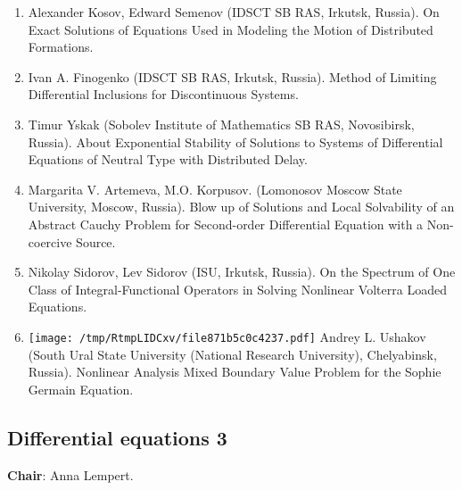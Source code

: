 \documentclass[
]{article}
\providecommand{\tightlist}{%
  \setlength{\itemsep}{0pt}\setlength{\parskip}{0pt}}
\begin{document}
\begin{enumerate}
\def\labelenumi{\arabic{enumi}.}
\tightlist
\item
  Alexander Kosov, Edward Semenov (IDSCT SB RAS, Irkutsk, Russia). On
  Exact Solutions of Equations Used in Modeling the Motion of
  Distributed Formations.
\item
  Ivan A. Finogenko (IDSCT SB RAS, Irkutsk, Russia). Method of Limiting
  Differential Inclusions for Discontinuous Systems.
\item
  Timur Yskak (Sobolev Institute of Mathematics SB RAS, Novosibirsk,
  Russia). About Exponential Stability of Solutions to Systems of
  Differential Equations of Neutral Type with Distributed Delay.
\item
  Margarita V. Artemeva, M.O. Korpusov. (Lomonosov Moscow State
  University, Moscow, Russia). Blow up of Solutions and Local
  Solvability of an Abstract Cauchy Problem for Second-order
  Differential Equation with a Non-coercive Source.
\item
  Nikolay Sidorov, Lev Sidorov (ISU, Irkutsk, Russia). On the Spectrum
  of One Class of Integral-Functional Operators in Solving Nonlinear
  Volterra Loaded Equations.
\item
  \protect\texttt{[image: /tmp/RtmpLIDCxv/file871b5c0c4237.pdf]}
  Andrey L. Ushakov (South Ural State University (National Research
  University), Chelyabinsk, Russia). Nonlinear Analysis Mixed Boundary
  Value Problem for the Sophie Germain Equation.
\end{enumerate}

\hypertarget{de3}{%
\subsection{Differential equations 3}\label{de3}}

\textbf{Chair}: Anna Lempert.
\end{document}
